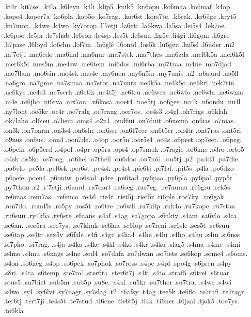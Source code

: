 {.ki4r
.kit7se.
.k4la
.k6leyn
.k4li
.klip5
.knik5
.kn6opn
.ko6maa
.ko6maf
.k4op
.kope4
.koper7a
.ko6pla
.kop5o
.ko7rag.
.kor6st
.kors7te.
.k6rak.
.kr6üge
.kryt5
.ku7mon.
.k4we
.k4wo
.ky7otop
.l'7etji
.la6eti
.la6kwa
.la5sa
.lei5s4
.lek7oë.
.le6poo
.le5pr
.le7shab
.le6son
.le4sp
.les5t
.le6suu
.lig5e
.li4gi
.li6gom
.li6gre
.li7pase
.l6loyd
.lo6chn
.lof7ui.
.lo6glê
.l6ontd
.los5k
.lu6gen
.lui5sl
.l6üder
.m2
.m'7etji
.ma6cdo
.ma6nal
.ma6nur
.ma7stek
.ma7thes
.ma6zda
.mel6k5a
.mel6k5l
.mer6k5l
.mes5m
.me4sw
.me6tem
.mi6dos
.mi6rba
.mi7traa
.m4ne
.mo7djad
.mo7flam
.mo6sin
.mo4sk
.mu4e
.my6nen
.my6n5in
.my7unis
.n2
.n6aand
.na5fl
.na6gro
.na7groe
.na7smaa
.na7stor
.na7uurs
.ne4k5a
.ne4k5o
.ne6kri
.nek7rin
.ne6kys
.ne4s3
.ne7serh
.n6etik
.ne4t5j
.ne6tru
.ne6wca
.ne6wfo
.ne6wla
.ne6wma
.ni4e
.ni6jho
.ni6rva
.nix7on.
.n6kosa
.noet4
.noe5tj
.no6gee
.no4k
.n6ondu
.nu4l
.ny7lont
.oe5kr
.oe4r
.oe7ralg
.oe7rang
.oer7os.
.oe4s3
.o4gl
.oh7rigs
.o6klah
.ok7laho
.ol6ieu
.o7lieui
.oms4
.o2n1
.ond6ui
.on7duit
.o6nemo
.on6ias
.o7nias.
.on3k
.on7parm
.on3s4
.on6she
.on6sse
.on6t7eer
.on6t5er
.on4tr
.ont7ras
.ont5ri
.o9nus
.on6us.
.oon4
.oon7de.
.o4op
.oor5n
.oor5s4
.oo4s
.o6peet
.op7eet.
.o6peg.
.o6pein
.o6p5erd
.o4pof
.o4pr
.op5ra
.ops4
.op7smuk
.o7ragie
.or6kne
.o3ro
.orto5
.o4sk
.os5ko
.os7oog.
.ot6hel
.o7thell
.ou6doo
.ou7nôi.
.ou5tj
.p2
.pa4d3
.pa7die.
.pa6vlo
.pe5la
.pel6sk
.per6st
.pe4sk
.pe4st
.pie6tj
.pi7laf.
.pit5s
.p4la
.po6dzo
.p6oefe
.poen4
.p6ontw
.po6sad
.p4re
.pu6tad
.py6paa
.py6pla
.py6pol
.pyp5r
.py7thon
.r2
.r'7etji
.r6aard
.ra7dart
.ra6seg
.ras7eg.
.re7aumu
.re6gru
.rek5s
.re6mas
.rem7as.
.re6mco
.re4sl
.rie4t
.riet5j
.riet5r
.ri6ple
.roc7ky.
.ro6gak
.ron7do.
.rond5s
.ro5py
.ros5t
.ro6tre
.ro6wli
.ru7klip
.ruk4o
.ru7kope
.ru7staa
.ru6suu
.ry4k5a
.ry6ste
.s6aans
.s4af
.s4ag
.sa7gopa
.s6akty
.s4am
.sa6vlo
.s4ca
.se6an.
.see5ra
.see7ys.
.se7khuk
.se6laa
.se6lop
.se7reni
.se6sle
.ses5t
.se6suu
.se6tap
.se4tr
.sex5y
.s6fale
.s4fi
.s4gr
.s4ha4
.s4he
.s4hi
.s4ho
.s4hu
.s4in
.si6nes
.si7pho.
.si7rag.
.s4ja
.s4ka
.s4ke
.s4kl
.s4ko
.s4kr
.s4ku
.slag5
.s4ma
.s4me
.s4mi
.s4mo
.s4mu
.s6nags
.s4ne
.sod4
.so7dafa
.so7dwan
.so7iets
.so6kop
.some4
.s6oms.
.s4on
.so6neg
.s4op
.so6pek
.so7phok
.so7ross
.s4pe
.s4pl
.spo4g
.s6pren
.s4py
.s8ri.
.s4ta
.s6temp
.ste7rol
.ster6ta
.ster6t7j
.s4ti
.s4to
.straf5
.s6trei
.s6tuar
.stuc5
.su7biet
.sub5m
.sub5p
.su8e.
.s4ui
.su5kr
.su7ther
.su7tra.
.s4we
.s4wi
.s4wo
.sy1
.sy6lvi
.sy7nagr
.sy7slag
.t2
.t6afsy
.t4ag
.tee5k
.te6flo
.te7rafi
.te7ragr
.ter6tj
.tert7ji
.te4s5t
.te7stud
.ti6ene
.tie6t5j
.ti4k
.ti6ner
.t6jaai
.tjok5
.toe7ys.
.to6kla
}
